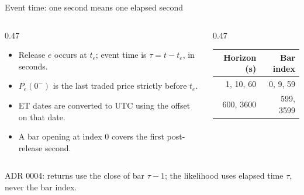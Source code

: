 \documentclass[aspectratio=169,11pt]{beamer}
\newcommand{\source}[1]{\par\vfill{\scriptsize\color{muted}#1}\par}
\begin{document}
\begin{frame}{Event time: one second means one elapsed second}
\begin{columns}[T,onlytextwidth]
\begin{column}{0.47\textwidth}\begin{itemize}
\item Release $e$ occurs at $t_e$; event time is $\tau=t-t_e$, in seconds.
\item $P_e(0^-)$ is the last traded price strictly before $t_e$.
\item ET dates are converted to UTC using the offset on that date.
\item A bar opening at index 0 covers the first post-release second.
\end{itemize}\end{column}
\begin{column}{0.47\textwidth}\centering
{}
\vspace{0.6cm}
\begin{tabular}{rr}\toprule
Horizon (s) & Bar index\\\midrule
1, 10, 60 & 0, 9, 59\\600, 3600 & 599, 3599\\\bottomrule
\end{tabular}
\end{column}\end{columns}
\source{ADR 0004: returns use the close of bar $\tau-1$; the likelihood uses elapsed time $\tau$, never the bar index.}
\end{frame}
\end{document}
